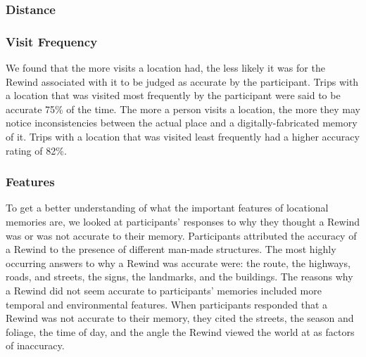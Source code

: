 \documentclass{sigchi}
\begin{document}
\subsubsection{Distance}


\subsubsection{Visit Frequency}
We found that the more visits a location had, the less likely it was for the Rewind associated with it to be judged as accurate by the participant. Trips with a location that was visited most frequently by the participant were said to be accurate 75\% of the time. The more a person visits a location, the more they may notice inconsistencies between the actual place and a digitally-fabricated memory of it. Trips with a location that was visited least frequently had a higher accuracy rating of 82\%.




\subsubsection{Features}
To get a better understanding of what the important features of locational memories are, we looked at participants' responses to why they thought a Rewind was or was not accurate to their memory. Participants attributed the accuracy of a Rewind to the presence of different man-made structures. The most highly occurring answers to why a Rewind was accurate were: the route, the highways, roads, and streets, the signs, the landmarks, and the buildings. The reasons why a Rewind did not seem accurate to participants' memories included more temporal and environmental features. When participants responded that a Rewind was not accurate to their memory, they cited the streets, the season and foliage, the time of day, and the angle the Rewind viewed the world at as factors of inaccuracy.
\end{document}

